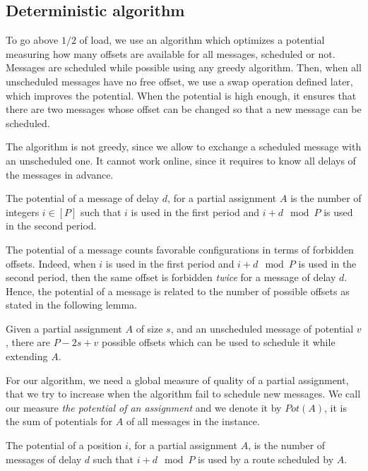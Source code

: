 \documentclass[a4paper,UKenglish,cleveref, autoref, thm-restate]{lipics-v2019}
\begin{document}
\subsection{Deterministic algorithm}

To go above $1/2$ of load, we use an algorithm which optimizes a potential measuring how many offsets are available for all messages, scheduled or not. Messages are scheduled while possible using any greedy algorithm.
Then, when all unscheduled messages have no free offset, we use a swap operation defined later, which improves the potential. When the potential is high enough, it ensures that there are two messages whose offset can be changed so that a new message can be scheduled. 

 The algorithm is not greedy, since we allow to exchange a scheduled message with an unscheduled one. It cannot work online, since it requires to know all delays of the messages in advance. 

\begin{definition}
The potential of a message of delay $d$, for a partial assignment $A$
is the number of integers $i \in [P]$ such that $i$ is used in the first period and $i+d \mod P$ is used in the second period.
\end{definition}

The potential of a message counts favorable configurations in terms of forbidden offsets.
Indeed, when $i$ is used in the first period and $i+d \mod P$ is used in the second period,
then the same offset is forbidden \emph{twice} for a message of delay $d$. Hence, the potential of a message is related to the number of possible offsets as stated in the following lemma. 

\begin{lemma}
Given a partial assignment $A$ of size $s$, and an unscheduled message of potential 
$v$, there are $P - 2s + v$ possible offsets which can be used to schedule it while extending $A$.
\end{lemma}

For our algorithm, we need a global measure of quality of a partial assignment, 
that we try to increase when the algorithm fail to schedule new messages. 
We call our measure \emph{the potential of an assignment} and we denote it by $Pot(A)$, it is the sum of potentials for $A$ of all messages in the instance.


\begin{definition}
The potential of a position $i$, for a partial assignment $A$, is the number of messages of delay $d$ such that $i+d \mod P$ is used by a route scheduled by $A$. 
\end{definition}
\end{document}
